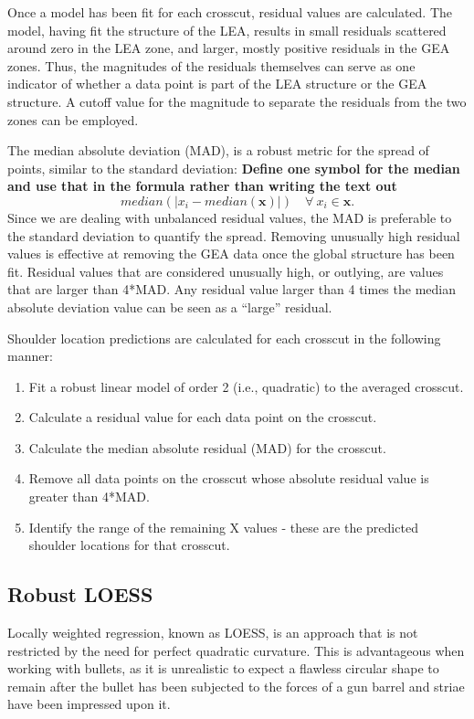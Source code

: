 \documentclass[]{article}
\begin{document}
Once a model has been fit for each crosscut, residual values are
calculated. The model, having fit the structure of the LEA, results in
small residuals scattered around zero in the LEA zone, and larger,
mostly positive residuals in the GEA zones. Thus, the magnitudes of the
residuals themselves can serve as one indicator of whether a data point
is part of the LEA structure or the GEA structure. A cutoff value for
the magnitude to separate the residuals from the two zones can be
employed.

The median absolute deviation (MAD), is a robust metric for the spread
of points, similar to the standard deviation: \textbf{Define one symbol
for the median and use that in the formula rather than writing the text
out}
\[median(|x_i- median(\mathbf{x})|) \quad \forall\ x_i \in \mathbf{x}.\]
Since we are dealing with unbalanced residual values, the MAD is
preferable to the standard deviation to quantify the spread. Removing
unusually high residual values is effective at removing the GEA data
once the global structure has been fit. Residual values that are
considered unusually high, or outlying, are values that are larger than
4*MAD. Any residual value larger than 4 times the median absolute
deviation value can be seen as a ``large'' residual.

Shoulder location predictions are calculated for each crosscut in the
following manner:\\

\begin{enumerate}
\item Fit a robust linear model of order 2 (i.e., quadratic) to the averaged crosscut.   
\item Calculate a residual value for each data point on the crosscut.  
\item Calculate the median absolute residual (MAD) for the crosscut.  
\item Remove all data points on the crosscut whose absolute residual value is greater than 4*MAD.  
\item Identify the range of the remaining X values - these are the predicted shoulder locations for that crosscut.   
\end{enumerate}

\subsection{Robust LOESS}

Locally weighted regression, known as LOESS, is an approach that is not
restricted by the need for perfect quadratic curvature. This is
advantageous when working with bullets, as it is unrealistic to expect a
flawless circular shape to remain after the bullet has been subjected to
the forces of a gun barrel and striae have been impressed upon it.
\end{document}
